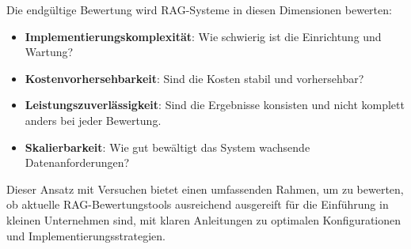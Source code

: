 Die endgültige Bewertung wird RAG-Systeme in diesen Dimensionen bewerten:
\begin{itemize}
    \item \textbf{Implementierungskomplexität}: Wie schwierig ist die Einrichtung und Wartung?
    \item \textbf{Kostenvorhersehbarkeit}: Sind die Kosten stabil und vorhersehbar?
    \item \textbf{Leistungszuverlässigkeit}: Sind die Ergebnisse konsisten und nicht komplett anders bei jeder Bewertung.
    \item \textbf{Skalierbarkeit}: Wie gut bewältigt das System wachsende Datenanforderungen?
\end{itemize}

Dieser Ansatz mit Versuchen bietet einen umfassenden Rahmen, um zu bewerten, ob aktuelle RAG-Bewertungstools ausreichend ausgereift für die Einführung in kleinen Unternehmen sind, mit klaren Anleitungen zu optimalen Konfigurationen und Implementierungsstrategien. 
